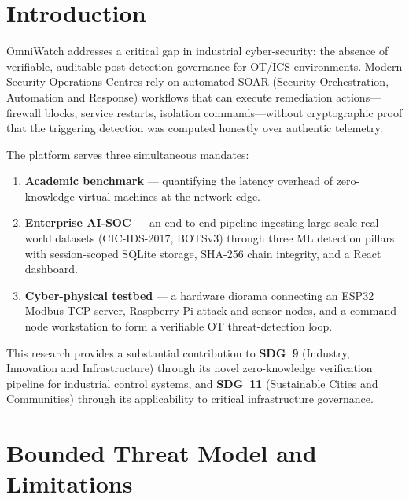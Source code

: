 \documentclass[12pt,a4paper]{article}
\begin{document}
\newpage
\tableofcontents
\newpage

\section{Introduction}

OmniWatch addresses a critical gap in industrial cyber-security: the
absence of verifiable, auditable post-detection governance for OT/ICS
environments. Modern Security Operations Centres rely on automated SOAR
(Security Orchestration, Automation and Response) workflows that can
execute remediation actions---firewall blocks, service restarts,
isolation commands---without cryptographic proof that the triggering
detection was computed honestly over authentic telemetry.

The platform serves three simultaneous mandates:

\begin{enumerate}
  \item \textbf{Academic benchmark} --- quantifying the latency overhead
        of zero-knowledge virtual machines at the network edge.
  \item \textbf{Enterprise AI-SOC} --- an end-to-end pipeline ingesting
        large-scale real-world datasets (CIC-IDS-2017, BOTSv3) through
        three ML detection pillars with session-scoped SQLite storage,
        SHA-256 chain integrity, and a React dashboard.
  \item \textbf{Cyber-physical testbed} --- a hardware diorama connecting
        an ESP32 Modbus TCP server, Raspberry Pi attack and sensor nodes,
        and a command-node workstation to form a verifiable OT threat-detection loop.
\end{enumerate}

This research provides a substantial contribution to \textbf{SDG~9} (Industry,
Innovation and Infrastructure) through its novel zero-knowledge verification
pipeline for industrial control systems, and \textbf{SDG~11} (Sustainable Cities
and Communities) through its applicability to critical infrastructure governance.

\section{Bounded Threat Model and Limitations}
\end{document}
